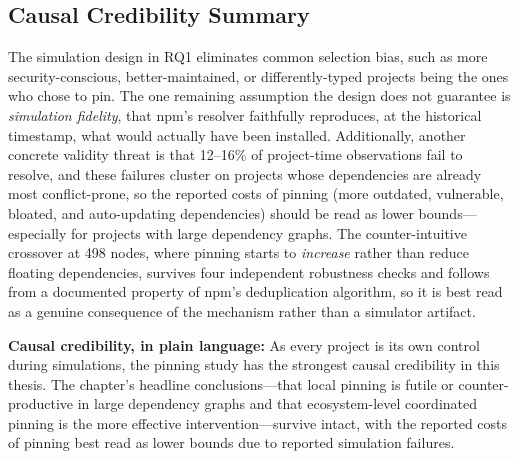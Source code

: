 \subsection{Causal Credibility Summary}
\label{sec:pinning-credibility-summary}

The simulation design in RQ1 eliminates common selection bias, such as more security-conscious, better-maintained, or differently-typed projects being the ones who chose to pin.
The one remaining assumption the design does not guarantee is \textit{simulation fidelity}, that npm's resolver faithfully reproduces, at the historical timestamp, what would actually have been installed.
Additionally, another concrete validity threat is that 12--16\% of project-time observations fail to resolve, and these failures cluster on projects whose dependencies are already most conflict-prone, so the reported costs of pinning (more outdated, vulnerable, bloated, and auto-updating dependencies) should be read as lower bounds---especially for projects with large dependency graphs.
The counter-intuitive crossover at 498 nodes, where pinning starts to \emph{increase} rather than reduce floating dependencies, survives four independent robustness checks and follows from a documented property of npm's deduplication algorithm, so it is best read as a genuine consequence of the mechanism rather than a simulator artifact.

\begin{summary-rq}
\textbf{Causal credibility, in plain language:} As every project is its own control during simulations, the pinning study has the strongest causal credibility in this thesis. 
The chapter's headline conclusions---that local pinning is futile or counter-productive in large dependency graphs and that ecosystem-level coordinated pinning is the more effective intervention---survive intact, with the reported costs of pinning best read as lower bounds due to reported simulation failures.
\end{summary-rq}
